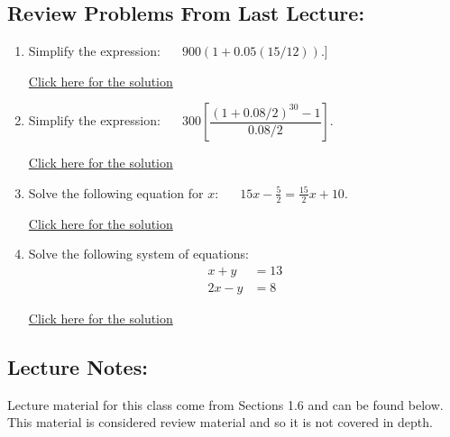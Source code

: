 \documentclass[
]{book}
\providecommand{\tightlist}{%
  \setlength{\itemsep}{0pt}\setlength{\parskip}{0pt}}
\begin{document}
\subsection*{Review Problems From Last Lecture:}\label{review-problems-from-last-lecture}

\begin{enumerate}
\def\labelenumi{\arabic{enumi}.}
\tightlist
\item
  Simplify the expression: \(\;\;\;\;\; 900(1 + 0.05(15/12))\).{]}

  \href{https://youtu.be/zgLRtB3JUpE}{Click here for the solution}
\item
  Simplify the expression: \(\;\;\;\;\; 300 \left[\dfrac{(1 + 0.08/2)^{30} - 1}{0.08/2} \right]\).

  \href{https://youtu.be/Emv6osLWEvE}{Click here for the solution}
\item
  Solve the following equation for \(x\): \(\;\;\;\;\; 15 x - \frac{5}{2} = \frac{15}{2}x + 10\).

  \href{https://youtu.be/3WmpvL441rA}{Click here for the solution}
\item
  Solve the following system of equations: \begin{align*} x + y &= 13\\ 2x - y &=8 \end{align*}

  \href{https://youtu.be/57H_RLVgpc8}{Click here for the solution}
\end{enumerate}

\subsection*{Lecture Notes:}\label{lecture-notes-1}

Lecture material for this class come from Sections 1.6 and can be found below. This material is considered review material and so it is not covered in depth.
\end{document}
